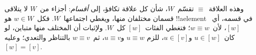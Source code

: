 \documentclass[../../../include/open-logic-section]{subfiles}
\begin{document}
وهذه العلاقة~$\equiv$ تقسّم~$W$، شأن كل علاقة
تكافؤ، إلى \emph{أقسام}: أجزاء من~$W$ لا يتلاقى
قسمان مختلفان منها، ويغطي اجتماعها~$W$.
فكل~$w \in W$ هو !!a{element} في قسمه،
أي~$[w]$، لأن~$w \equiv w$؛ فتغطي الفئات~$[w]$
كل~$W$. ولإثبات أن المختلف منها متباين،
لو كان~$u \in [w]$ و$u \in [v]$، للزم
$u \equiv w$ و$u \equiv v$، ثم~$w \equiv v$
بالتناظر والتعدي؛ وعليه~$[w]=[v]$.
\end{document}
